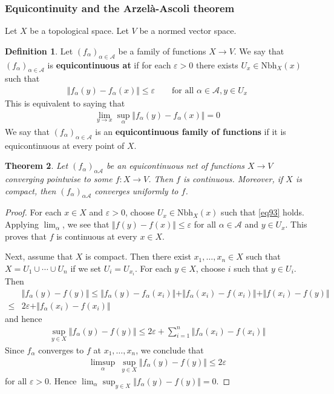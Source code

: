 \documentclass[12pt,b5paper,notitlepage]{article}
\theoremstyle{definition}
\newtheorem{df}{Definition}[subsection]
\theoremstyle{plain}
\newtheorem{thm}[df]{Theorem}
\newcommand{\scr}{\mathscr}
\newcommand{\Nbh}{\mathrm{Nbh}}
\newcommand{\eps}{\varepsilon}
\numberwithin{equation}{section}
\begin{document}
\subsubsection{Equicontinuity and the Arzel\`a-Ascoli theorem}

Let $X$ be a topological space. Let $V$ be a normed vector space.

\begin{df}
Let $(f_\alpha)_{\alpha\in\scr A}$ be a family of functions $X\rightarrow V$. We say that $(f_\alpha)_{\alpha\in\scr A}$ is \textbf{equicontinuous at }  if for each $\eps>0$ there exists $U_x\in\Nbh_X(x)$ such that
\begin{align}\label{eq93}
\Vert f_\alpha(y)-f_\alpha(x)\Vert\leq\eps\qquad\text{for all }\alpha\in\scr A,y\in U_x
\end{align}
This is equivalent to saying that
\begin{align*}
\lim_{y\rightarrow x}\sup_\alpha\Vert f_\alpha(y)-f_\alpha(x)\Vert=0
\end{align*}
We say that $(f_\alpha)_{\alpha\in\scr A}$ is an \textbf{equicontinuous family of functions} if it is equicontinuous at every point of $X$.
\end{df}


\begin{thm}\label{lb179}
Let $(f_\alpha)_{\alpha\scr A}$ be an equicontinuous net of functions $X\rightarrow V$ converging pointwise to some $f:X\rightarrow V$. Then $f$ is continuous. Moreover, if $X$ is compact, then $(f_\alpha)_{\alpha\scr A}$ converges uniformly to $f$.
\end{thm}

\begin{proof}
For each $x\in X$ and $\eps>0$, choose  $U_x\in\Nbh_X(x)$ such that \eqref{eq93} holds. Applying $\lim_\alpha$, we see that $\Vert f(y)-f(x)\Vert\leq\eps$ for all $\alpha\in\scr A$ and $y\in U_x$. This proves that $f$ is continuous at every $x\in X$.

Next, assume that $X$ is compact. Then there exist $x_1,\dots,x_n\in X$ such that $X=U_1\cup\cdots\cup U_n$ if we set $U_i=U_{x_i}$. For each $y\in X$, choose $i$ such that $y\in U_i$. Then
\begin{align*}
&\Vert f_\alpha(y)-f(y)\Vert\leq\Vert f_\alpha(y)-f_\alpha(x_i)\Vert+\Vert f_\alpha(x_i)-f(x_i)\Vert+\Vert f(x_i)-f(y)\Vert\\
\leq& 2\eps+\Vert f_\alpha(x_i)-f(x_i)\Vert
\end{align*}
and hence
\begin{align*}
\sup_{y\in X}\Vert f_\alpha(y)-f(y)\Vert\leq 2\eps+\sum_{i=1}^n\Vert f_\alpha(x_i)-f(x_i)\Vert
\end{align*}
Since $f_\alpha$ converges to $f$ at $x_1,\dots,x_n$, we conclude that
\begin{align*}
\limsup_\alpha ~\sup_{y\in X}\Vert f_\alpha(y)-f(y)\Vert\leq 2\eps
\end{align*}
for all $\eps>0$. Hence $\lim_\alpha\sup_{y\in X}\Vert f_\alpha(y)-f(y)\Vert=0$.
\end{proof}
\end{document}
